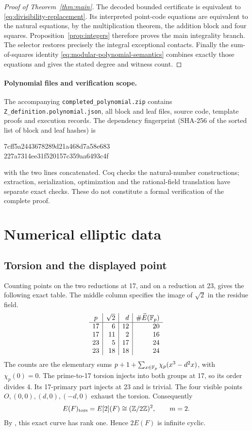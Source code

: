 \documentclass[11pt]{article}
\theoremstyle{definition}
\begin{document}
\begin{proof}[Proof of Theorem~\ref{thm:main}]
The decoded bounded certificate is equivalent to
\eqref{eq:divisibility-replacement}. Its interpreted point-code equations
are equivalent to the natural equations, by the multiplication theorem,
the addition block and four squares. Proposition~\ref{prop:integers}
therefore proves the main integrality branch. The selector restores
precisely the integral exceptional contacts. Finally the sum-of-squares
identity \eqref{eq:modular-polynomial-semantics} combines exactly those
equations and gives the stated degree and witness count.
\end{proof}

\paragraph{Polynomial files and verification scope.}
The accompanying \texttt{completed\_polynomial.zip} contains
\texttt{Z\_definition.polynomial.json}, all block and leaf files,
source code, template proofs and execution records. The dependency
fingerprint (SHA-256 of the sorted list of block and leaf hashes) is
\begin{center}\small\ttfamily
7cff5a2443678289d21a468d7a58e683\\
227a7314ee31f520157c359aa6493c4f
\end{center}
with the two lines concatenated. Coq checks the natural-number
constructions; extraction, serialization, optimization and the
rational-field translation have separate exact checks. These do not
constitute a formal verification of the complete proof.

\appendix

\section{Numerical elliptic data}\label{sec:numerical-elliptic}

\subsection{Torsion and the displayed point}

Counting points on the two reductions at 17, and on a reduction at 23,
gives the following exact table. The middle column specifies the image
of \(\sqrt2\) in the residue field.
\[
\begin{array}{c|r|r|r}
p&\sqrt2&d&\#\widetilde E(\mathbb F_p)\\\hline
17&6&12&20\\
17&11&2&16\\
23&5&17&24\\
23&18&18&24
\end{array}
\]
The counts are the elementary sums
\(p+1+\sum_{x\in\mathbb F_p}\chi_p(x^3-d^2x)\), with \(\chi_p(0)=0\).
The prime-to-17 torsion injects into both groups at 17, so its order
divides 4. Its 17-primary part injects at 23 and is trivial. The
four visible points \(O,(0,0),(d,0),(-d,0)\) exhaust the torsion.
Consequently
\[
 E(F)_{\rm tors}=E[2](F)\cong(\mathbb Z/2\mathbb Z)^2,\qquad m=2.
\]
By \cite[Proposition 2.1, proved in Section 5]{H10}, this exact
curve has rank one. Hence \(2E(F)\) is infinite cyclic.
\end{document}
